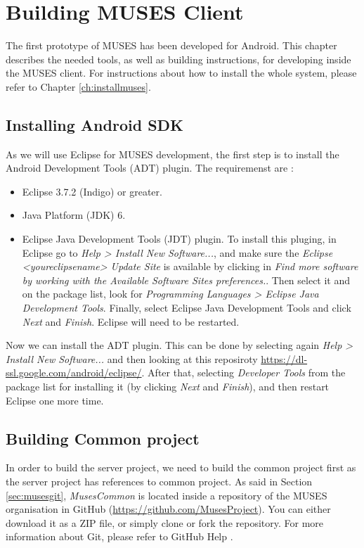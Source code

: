 \chapter{Building MUSES Client}
\label{ch:client}

The first prototype of MUSES has been developed for Android. This chapter describes the needed tools, as well as building instructions, for developing inside the MUSES client. For instructions about how to install the whole system, please refer to Chapter \ref{ch:installmuses}.

\section{Installing Android SDK}
\label{sec:ADT}

As we will use Eclipse for MUSES development, the first step is to install the Android Development Tools (ADT) plugin. The requiremenst are \cite{adt:site}:

\begin{itemize}
  \item Eclipse 3.7.2 (Indigo) or greater.
  \item Java Platform (JDK) 6.
  \item Eclipse Java Development Tools (JDT) plugin. To install this pluging, in Eclipse go to \textit{Help > Install New Software...}, and make sure the \textit{Eclipse <youreclipsename> Update Site} is available by clicking in \textit{Find more software by working with the Available Software Sites preferences.}. Then select it and on the package list, look for \textit{Programming Languages > Eclipse Java Development Tools}. Finally, select Eclipse Java Development Tools and click \textit{Next} and \textit{Finish}. Eclipse will need to be restarted.
\end{itemize}

Now we can install the ADT plugin. This can be done by selecting again \textit{Help > Install New Software...} and then looking at this reposiroty \url{https://dl-ssl.google.com/android/eclipse/}. After that, selecting \textit{Developer Tools} from the package list for installing it (by clicking \textit{Next} and \textit{Finish}), and then restart Eclipse one more time.

\section{Building Common project}
\label{sec:common}

In order to build the server project, we need to build the common project first as the server project has references to common project. As said in Section \ref{sec:musesgit}, \textit{MusesCommon} is located inside a repository of the MUSES organisation in GitHub (\url{https://github.com/MusesProject}). You can either download it as a ZIP file, or simply clone or fork the repository. For more information about Git, please refer to GitHub Help \cite{githelp:site}.

